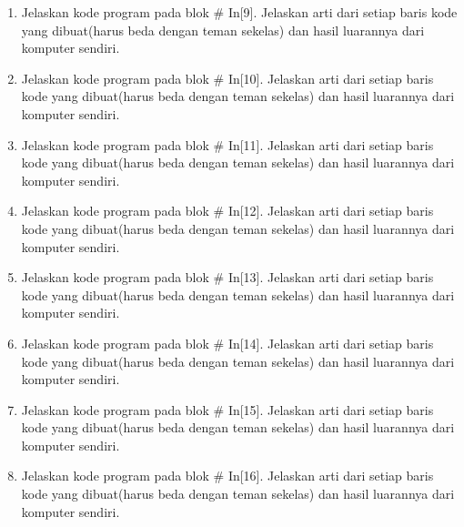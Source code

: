 \begin{enumerate}
\item Jelaskan kode program pada blok \# In[9]. Jelaskan arti dari setiap baris kode yang dibuat(harus beda dengan teman sekelas) dan hasil luarannya dari komputer sendiri.


\item Jelaskan kode program pada blok \# In[10]. Jelaskan arti dari setiap baris kode yang dibuat(harus beda dengan teman sekelas) dan hasil luarannya dari komputer sendiri.


\item Jelaskan kode program pada blok \# In[11]. Jelaskan arti dari setiap baris kode yang dibuat(harus beda dengan teman sekelas) dan hasil luarannya dari komputer sendiri.


\item Jelaskan kode program pada blok \# In[12]. Jelaskan arti dari setiap baris kode yang dibuat(harus beda dengan teman sekelas) dan hasil luarannya dari komputer sendiri.


\item Jelaskan kode program pada blok \# In[13]. Jelaskan arti dari setiap baris kode yang dibuat(harus beda dengan teman sekelas) dan hasil luarannya dari komputer sendiri.


\item Jelaskan kode program pada blok \# In[14]. Jelaskan arti dari setiap baris kode yang dibuat(harus beda dengan teman sekelas) dan hasil luarannya dari komputer sendiri.


\item Jelaskan kode program pada blok \# In[15]. Jelaskan arti dari setiap baris kode yang dibuat(harus beda dengan teman sekelas) dan hasil luarannya dari komputer sendiri.


\item Jelaskan kode program pada blok \# In[16]. Jelaskan arti dari setiap baris kode yang dibuat(harus beda dengan teman sekelas) dan hasil luarannya dari komputer sendiri.



\end{enumerate}
